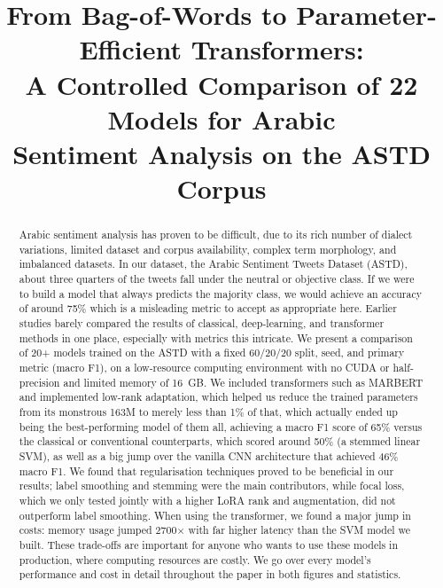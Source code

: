 \documentclass[conference]{IEEEtran}
\begin{document}
\title{From Bag-of-Words to Parameter-Efficient Transformers:\\
A Controlled Comparison of 22 Models for Arabic\\
Sentiment Analysis on the ASTD Corpus}

\author{
}

\maketitle

\begin{abstract}
Arabic sentiment analysis has proven to be difficult, due to its rich number of
dialect variations, limited dataset and corpus availability, complex term
morphology, and imbalanced datasets. In our dataset, the Arabic Sentiment Tweets
Dataset (ASTD), about three quarters of the tweets fall under the neutral or
objective class. If we were to build a model that always predicts the majority
class, we would achieve an accuracy of around 75\% which is a misleading metric
to accept as appropriate here. Earlier studies barely compared the results of
classical, deep-learning, and transformer methods in one place, especially with
metrics this intricate. We present a comparison of 20+ models trained on the ASTD
with a fixed 60/20/20 split, seed, and primary metric (macro F1), on a low-resource
computing environment with no CUDA or half-precision and limited memory of 16~GB.
We included transformers such as MARBERT and implemented low-rank adaptation, which
helped us reduce the trained parameters from its monstrous 163M to merely less than 1\% of that,
which actually ended up being the best-performing model of them all, achieving a macro F1
score of 65\% versus the classical or conventional counterparts, which scored around 50\%
(a stemmed linear SVM), as well as a big jump over the vanilla CNN architecture that achieved
46\% macro F1. We found that regularisation techniques proved to be beneficial in our results;
label smoothing and stemming were the main contributors, while focal loss, which we only
tested jointly with a higher LoRA rank and augmentation, did not outperform label smoothing.
When using the transformer, we found a major jump in costs: memory usage jumped 2700$\times$
with far higher latency than the SVM model we built. These trade-offs are important for
anyone who wants to use these models in production, where computing resources are costly. We
go over every model's performance and cost in detail throughout the paper in both figures and statistics.
\end{abstract}
\end{document}
